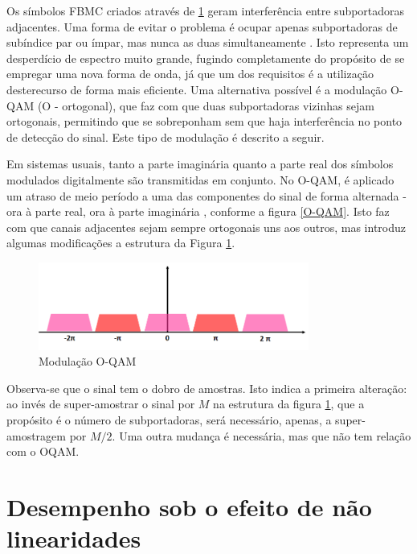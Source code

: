 Os símbolos FBMC criados através de \ref{simb_FBMC} geram interferência entre subportadoras adjacentes. Uma forma de evitar o problema é ocupar apenas subportadoras de subíndice par ou ímpar, mas nunca as duas simultaneamente \cite{Bellanger}. Isto representa um desperdício de espectro muito grande, fugindo completamente do propósito de se empregar uma nova forma de onda, já que um dos requisitos é a utilização desterecurso de forma mais eficiente. Uma alternativa possível é a modulação O-QAM (O - ortogonal), que faz com que duas subportadoras vizinhas sejam ortogonais, permitindo que se sobreponham sem que haja interferência no ponto de detecção do sinal. Este tipo de modulação é descrito a seguir.
\par Em sistemas usuais, tanto a parte imaginária quanto a parte real dos símbolos modulados digitalmente são transmitidas em conjunto. No O-QAM, é aplicado um atraso de meio período a uma das componentes do sinal de forma alternada - ora à parte real, ora à parte imaginária \cite{Bellanger}, conforme a figura \ref{O-QAM}. Isto faz com que canais adjacentes sejam sempre ortogonais uns aos outros, mas introduz algumas modificações a estrutura da Figura   \ref{simb_FBMC}.   
 
\begin{figure}[h!]
\centering
\includegraphics[width=3.5in]{sub_2.png} %
\caption{Modulação O-QAM}
\label{simb_FBMC}
\end{figure}

\par Observa-se que o sinal tem o dobro de amostras. Isto indica a primeira alteração: ao invés de super-amostrar o sinal por $M$ na estrutura da figura \ref{simb_FBMC}, que a propósito é o número de subportadoras, será necessário, apenas, a super-amostragem por $M/2$. Uma outra mudança é necessária, mas que não tem relação com o OQAM. 


\section{Desempenho sob o efeito de não linearidades }



















